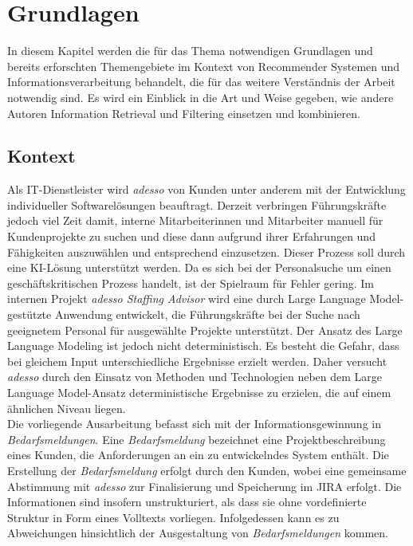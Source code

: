 \chapter{Grundlagen}
\label{chap:literaturüberblick}
In diesem Kapitel werden die für das Thema notwendigen Grundlagen und bereits erforschten Themengebiete im Kontext von Recommender Systemen und Informationsverarbeitung behandelt, die für das weitere Verständnis der Arbeit notwendig sind. Es wird ein Einblick in die Art und Weise gegeben, wie andere Autoren Information Retrieval und Filtering einsetzen und kombinieren.
\section{Kontext}
Als IT-Dienstleister wird \emph{adesso} von Kunden unter anderem mit der Entwicklung individueller Softwarelösungen beauftragt. Derzeit verbringen Führungskräfte jedoch viel Zeit damit, interne Mitarbeiterinnen und Mitarbeiter manuell für Kundenprojekte zu suchen und diese dann aufgrund ihrer Erfahrungen und Fähigkeiten auszuwählen und entsprechend einzusetzen. Dieser Prozess soll durch eine KI-Lösung unterstützt werden. Da es sich bei der Personalsuche um einen geschäftskritischen Prozess handelt, ist der Spielraum für Fehler gering. Im internen Projekt \emph{adesso Staffing Advisor} wird eine durch Large Language Model-gestützte Anwendung entwickelt, die Führungskräfte bei der Suche nach geeignetem Personal für ausgewählte Projekte unterstützt. Der Ansatz des Large Language Modeling ist jedoch nicht deterministisch. Es besteht die Gefahr, dass bei gleichem Input unterschiedliche Ergebnisse erzielt werden. Daher versucht \emph{adesso} durch den Einsatz von Methoden und Technologien neben dem Large Language Model-Ansatz deterministische Ergebnisse zu erzielen, die auf einem ähnlichen Niveau liegen.\\

Die vorliegende Ausarbeitung befasst sich mit der Informationsgewinnung in \emph{Bedarfsmeldungen}. Eine \emph{Bedarfsmeldung} bezeichnet eine Projektbeschreibung eines Kunden, die Anforderungen an ein zu entwickelndes System enthält. Die Erstellung der \emph{Bedarfsmeldung} erfolgt durch den Kunden, wobei eine gemeinsame Abstimmung mit \emph{adesso} zur Finalisierung und Speicherung im JIRA erfolgt. Die Informationen sind insofern unstrukturiert, als dass sie ohne vordefinierte Struktur in Form eines Volltexts vorliegen. Infolgedessen kann es zu Abweichungen hinsichtlich der Ausgestaltung von \emph{Bedarfsmeldungen} kommen.\\


